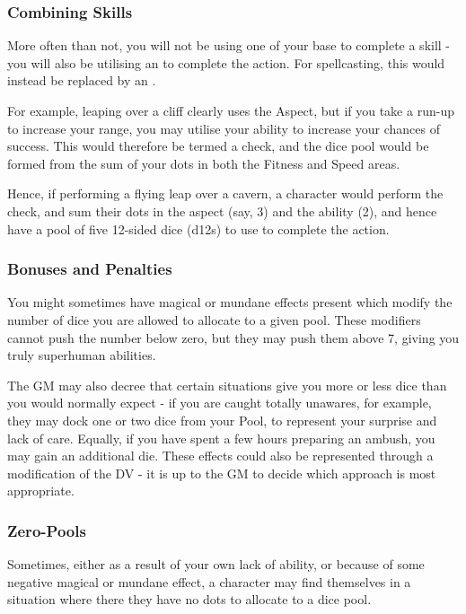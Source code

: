 \subsubsection{Combining Skills}

More often than not, you will not be using one of your base  to complete a skill - you will also be utilising an  to complete the action. For spellcasting, this would instead be replaced by an . 

For example, leaping over a cliff clearly uses the  Aspect, but if you take a run-up to increase your range, you may utilise your  ability to increase your chances of success. This would therefore be termed a  check, and the dice pool would be formed from the sum of your dots in both the Fitness and Speed areas.

Hence, if performing a flying leap over a cavern, a character would perform the  check, and sum their dots in the  aspect (say, 3) and the  ability (2), and hence have a pool of five 12-sided dice (d12s) to use to complete the action. 

\subsubsection{Bonuses and Penalties}

You might sometimes have magical or mundane effects present which modify the number of dice you are allowed to allocate to a given pool. These modifiers cannot push the number below zero, but they may push them above 7, giving you truly superhuman abilities.

The GM may also decree that certain situations give you more or less dice than you would normally expect - if you are caught totally unawares, for example, they may dock one or two dice from your Pool, to represent your surprise and lack of care. Equally, if you have spent a few hours preparing an ambush, you may gain an additional die. These effects could also be represented through a modification of the DV - it is up to the GM to decide which approach is most appropriate.

\subsubsection{Zero-Pools}

Sometimes, either as a result of your own lack of ability, or because of some negative magical or mundane effect, a character may find themselves in a situation where there they have no dots to allocate to a dice pool. 

